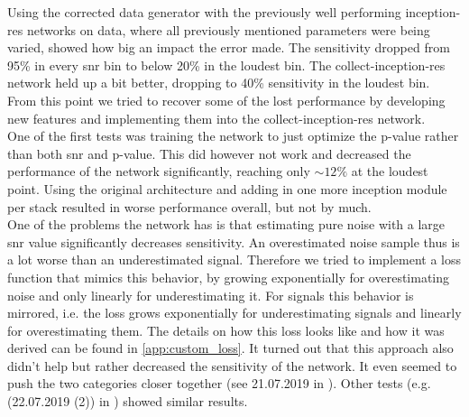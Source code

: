 \noindent Using the corrected data generator with the previously well performing inception-res networks on data, where all previously mentioned parameters were being varied, showed how big an impact the error made. The sensitivity dropped from 95\% in every \gls{snr} bin to below 20\% in the loudest bin. The collect-inception-res network held up a bit better, dropping to 40\% sensitivity in the loudest bin. From this point we tried to recover some of the lost performance by developing new features and implementing them into the collect-inception-res network.\medskip\\
One of the first tests was training the network to just optimize the p-value rather than both \gls{snr} and p-value. This did however not work and decreased the performance of the network significantly, reaching only $\sim 12\%$ at the loudest point. Using the original architecture and adding in one more inception module per stack resulted in worse performance overall, but not by much.\smallskip\\
One of the problems the network has is that estimating pure noise with a large \gls{snr} value significantly decreases sensitivity. An overestimated noise sample thus is a lot worse than an underestimated signal. Therefore we tried to implement a loss function that mimics this behavior, by growing exponentially for overestimating noise and only linearly for underestimating it. For signals this behavior is mirrored, i.e. the loss grows exponentially for underestimating signals and linearly for overestimating them. The details on how this loss looks like and how it was derived can be found in \autoref{app:custom_loss}. It turned out that this approach also didn't help but rather decreased the sensitivity of the network. It even seemed to push the two categories closer together (see 21.07.2019 in \cite{network_wiki}). Other tests (e.g. (22.07.2019 (2)) in \cite{network_wiki}) showed similar results.\medskip\\
